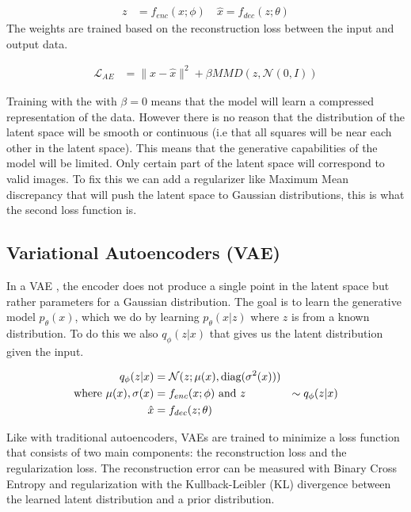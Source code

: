 \documentclass[conference,a4paper]{IEEEtran}
\begin{document}
\begin{align}
z &= f_{enc}(x; \phi) \quad \hat{x} = f_{dec}(z; \theta)
\end{align}
The weights are trained based on the reconstruction loss between the input and output data.

\begin{align}
\mathcal{L}_{AE} &= \| x - \hat{x} \|^2 + \beta MMD(z, \mathcal{N}(0, I))
\end{align}

Training with the with $\beta=0$ means that the model will learn a compressed representation of the data. However there is no reason that the distribution of the latent space will be smooth or continuous (i.e that all squares will be near each other in the latent space). This means that the generative capabilities of the model will be limited. Only certain part of the latent space will correspond to valid images. To fix this we can add a regularizer like Maximum Mean discrepancy \cite{grettonKernelMethodTwoSample2008} that will push the latent space to Gaussian distributions, this is what the second loss function is.

\subsection{Variational Autoencoders (VAE)}

In a VAE \cite{kingmaAutoEncodingVariationalBayes2022}, the encoder does not produce a single point in the latent space but rather parameters for a Gaussian distribution. The goal is to learn the generative model $p_\theta(x)$, which we do by learning $p_\theta(x|z)$ where $z$ is from a known distribution. To do this we also  $q_\phi(z|x)$ that gives us the latent distribution given the input.

\begin{align}
q_\phi(z|x) &= \mathcal{N}(z; \mu(x),\text{diag}(\sigma^2(x)))\\
\text{where } \mu(x), \sigma(x) &= f_{enc}(x; \phi) \text{ and }z &\sim q_\phi(z|x) \notag\\
\hat{x} &= f_{dec}(z; \theta)
\end{align}

Like with traditional autoencoders, VAEs are trained to minimize a loss function that consists of two main components: the reconstruction loss and the regularization loss. The reconstruction error can be measured with Binary Cross Entropy and regularization with the Kullback-Leibler (KL) \cite{kullbackInformationSufficiency1951} divergence between the learned latent distribution and a prior distribution.
\end{document}
